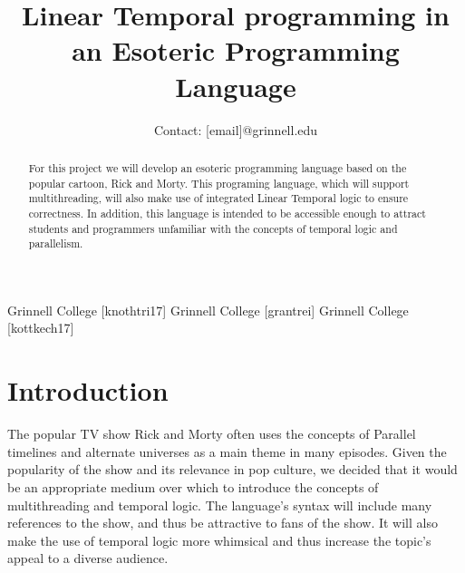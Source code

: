 \documentclass[numbers]{sigplanconf}
\begin{document}
\setlength{\pdfpageheight}{\paperheight}
\setlength{\pdfpagewidth}{\paperwidth}



\titlebanner{}        %
\preprintfooter{}   %

\title{Linear Temporal programming in an Esoteric Programming Language}
\subtitle{Contact: [email]@grinnell.edu}


           {Grinnell College}
           {[knothtri17]}
           {Grinnell College}
           {[grantrei]}
           {Grinnell College}
           {[kottkech17]}

\makeatletter
\def\@copyrightspace{\relax}
\makeatother
%

\maketitle

\begin{abstract}
For this project we will develop an esoteric programming language
based on the popular cartoon, Rick and Morty. This programing
language, which will support multithreading, will also make use of integrated Linear Temporal logic to ensure
correctness. In addition, this language
is intended to be accessible enough to attract students and
programmers unfamiliar with the concepts of temporal logic and parallelism.
\end{abstract}



\section{Introduction}
The popular TV show Rick and Morty often uses the concepts of
Parallel timelines and alternate universes as a main theme in many
episodes. Given the popularity of the show and its relevance in pop
culture, we decided that it would be an appropriate medium over
which to introduce the concepts of multithreading and temporal logic.
The language's syntax will include many references to the show,
and thus be attractive to fans of the show. It will also make the use of
temporal logic more whimsical and thus increase the topic's appeal to a diverse audience.
\end{document}
